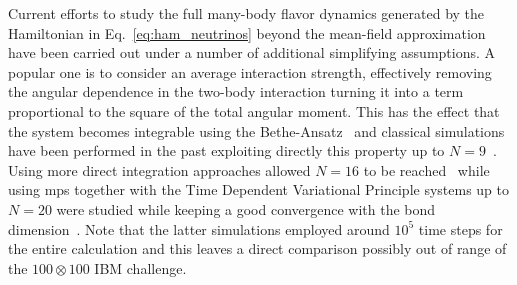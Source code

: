 Current efforts to study the full many-body flavor dynamics generated by the Hamiltonian in Eq.~\eqref{eq:ham_neutrinos} beyond the mean-field approximation have been carried out under a number of additional simplifying assumptions. A popular one is to consider an average interaction strength, effectively removing the angular dependence in the two-body interaction turning it into a term proportional to the square of the total angular moment. This has the effect that the system becomes integrable using the Bethe-Ansatz~\cite{Pehlivan2011} and classical simulations have been performed in the past exploiting directly this property up to $N=9$~\cite{Cervia2019}. Using more direct integration approaches allowed $N=16$ to be reached~\cite{Patwardhan2021} while using \gls{mps} together with the Time Dependent Variational Principle systems up to $N=20$ were studied while keeping a good convergence with the bond dimension~\cite{Cervia2022}. Note that the latter simulations employed around $10^5$ time steps for the entire calculation and this leaves a direct comparison possibly out of range of the $100 \otimes 100$ IBM challenge.

